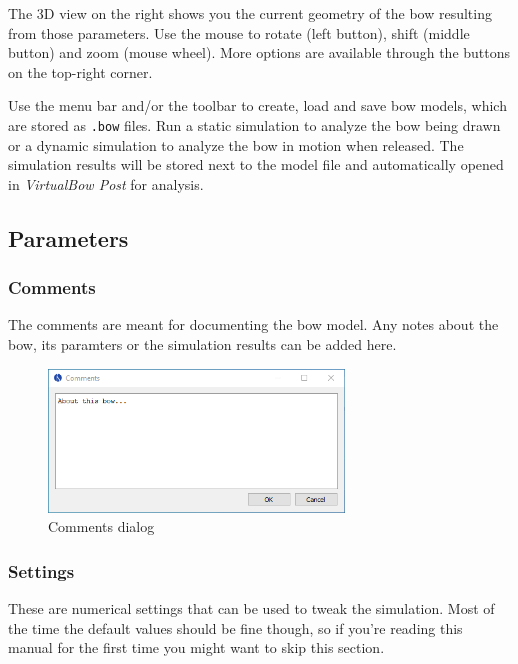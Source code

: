 \documentclass[12pt]{article}
\begin{document}
The 3D view on the right shows you the current geometry of the bow resulting from those parameters.
Use the mouse to rotate (left button), shift (middle button) and zoom (mouse wheel).
More options are available through the buttons on the top-right corner.

Use the menu bar and/or the toolbar to create, load and save bow models, which are stored as \texttt{.bow} files.
Run a static simulation to analyze the bow being drawn or a dynamic simulation to analyze the bow in motion when released.
The simulation results will be stored next to the model file and automatically opened in \textit{VirtualBow Post} for analysis.

\newpage
\subsection{Parameters}

\subsubsection{Comments}

The comments are meant for documenting the bow model.
Any notes about the bow, its paramters or the simulation results can be added here.
\bigskip

\begin{figure}[H]
\centering
\includegraphics[width=0.7\textwidth]{figures/screenshots/input/comments}
\caption{Comments dialog}
\label{fig:comments}
\end{figure}

\subsubsection{Settings}

These are numerical settings that can be used to tweak the simulation.
Most of the time the default values should be fine though, so if you're reading this manual for the first time you might want to skip this section.

\bigskip
\end{document}
